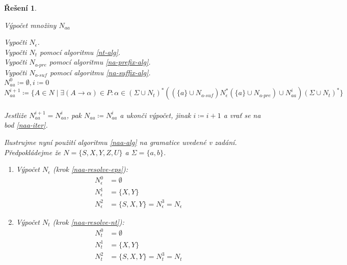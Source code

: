 \documentclass[11pt, a4paper]{article}
\def\gets{\coloneqq}
\newcommand{\aprefix}[1]{#1_{a\textit{-pre}}}
\newcommand{\asuffix}[1]{#1_{a\textit{-suf}}}
\theoremstyle{result}
\newtheorem*{result}{Řešení}
\begin{document}
\begin{enumerate}
\begin{result}
        {\centering
        \begin{minipage}{1\linewidth}
        \begin{algorithm}[H] \label{naa-alg}
            \caption{Výpočet množiny $N_{aa}$}
            Vypočti $N_\epsilon$. \label{naa-resolve-eps} \\
            Vypočti $N_t$ pomocí algoritmu \ref{nt-alg}. \label{naa-resolve-nt} \\
            Vypočti $\aprefix{N}$ pomocí algoritmu \ref{na-prefix-alg}. \label{naa-resolve-prefix} \\
            Vypočti $\asuffix{N}$ pomocí algoritmu \ref{na-suffix-alg}. \label{naa-resolve-suffix} \\
            $N_{aa}^0 \gets \emptyset, i \gets 0$ \label{naa-init} \\
            $N_{aa}^{i + 1} \gets \{A \in N \mid \exists (A \to \alpha) \in P: \alpha \in (\Sigma \cup N_t)^*((\{a\} \cup \asuffix{N})N_\epsilon^*(\{a\} \cup \aprefix{N}) \cup N_{aa}^i)(\Sigma \cup N_t)^*\}$ \label{naa-iter} \\
            Jestliže $N_{aa}^{i + 1} = N_{aa}^i$, pak $N_{aa} \gets N_{aa}^i$ a ukonči výpočet, jinak $i \gets i + 1$ a vrať se na bod \ref{naa-iter}. \label{naa-finish}
        \end{algorithm}
        \end{minipage}
        \par
        }
        
        Ilustrujme nyní použití algoritmu \ref{naa-alg} na gramatice uvedené v zadání. Předpokládejme že $N = \{S, X, Y, Z, U\}$ a $\Sigma = \{a, b\}$.
        
        \begin{enumerate}[(1)]
            \item Výpočet $N_\epsilon$ (krok \ref{naa-resolve-eps}):
            \begin{align*}
                N_\epsilon^0 &= \emptyset \\
                N_\epsilon^1 &= \{X, Y\} \\
                N_\epsilon^2 &= \{S, X, Y\} = N_\epsilon^3 = N_\epsilon
            \end{align*}
            
            \item Výpočet $N_t$ (krok \ref{naa-resolve-nt}):
            \begin{align*}
                N_t^0 &= \emptyset \\
                N_t^1 &= \{X, Y\} \\
                N_t^2 &= \{S, X, Y\} = N_t^3 = N_t
            \end{align*}
            

\end{enumerate}
\end{result}
\end{enumerate}
\end{document}
